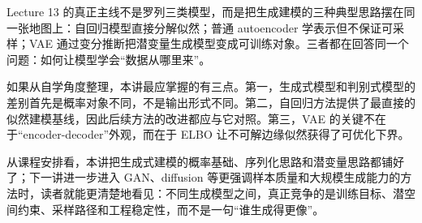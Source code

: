 \documentclass[a4paper]{article}
\begin{document}
    Lecture 13 的真正主线不是罗列三类模型，而是把生成建模的三种典型思路摆在同一张地图上：自回归模型直接分解似然；普通 autoencoder 学表示但不保证可采样；VAE 通过变分推断把潜变量生成模型变成可训练对象。三者都在回答同一个问题：如何让模型学会“数据从哪里来”。

    如果从自学角度整理，本讲最应掌握的有三点。第一，生成式模型和判别式模型的差别首先是概率对象不同，不是输出形式不同。第二，自回归方法提供了最直接的似然建模基线，因此后续方法的改进都应与它对照。第三，VAE 的关键不在于“encoder-decoder”外观，而在于 ELBO 让不可解边缘似然获得了可优化下界。

    从课程安排看，本讲把生成式建模的概率基础、序列化思路和潜变量思路都铺好了；下一讲进一步进入 GAN、diffusion 等更强调样本质量和大规模生成能力的方法时，读者就能更清楚地看见：不同生成模型之间，真正竞争的是训练目标、潜空间约束、采样路径和工程稳定性，而不是一句“谁生成得更像”。
\end{document}
